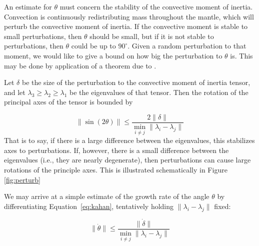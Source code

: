 \documentclass[extra,mreferee]{gji}
\begin{document}
An estimate for $\theta$ must concern the stability of the convective moment of inertia. 
Convection is continuously redistributing mass throughout the mantle, which will perturb the convective moment of inertia.  
If the convective moment is stable to small perturbations, then $\theta$ should be small, but if it is not stable to perturbations, then $\theta$ could be up to $90^\circ$. 
Given a random perturbation to that moment, we would like to give a bound on how big the perturbation to $\theta$ is. 
This may be done by application of a theorem due to \citet{davis1970rotation}.

Let $\delta$ be the size of the perturbation to the convective moment of inertia tensor, and let $\lambda_3 \ge \lambda_2 \ge \lambda_1$ be the eigenvalues of that tensor.  
Then the rotation of the principal axes of the tensor is bounded by

\begin{equation}
\lVert \sin(2 \theta) \rVert \le \frac{ 2 \lVert \delta \rVert}{ \displaystyle \min_{i \neq j} \lVert \lambda_i - \lambda_j \rVert }
\label{eq:kahan}
\end{equation} 
That is to say, if there is a large difference between the eigenvalues, this stabilizes axes to perturbations.  
If, however, there is a small difference between the eigenvalues (i.e., they are nearly degenerate), then perturbations can cause large rotations of the principle axes.
This is illustrated schematically in Figure \ref{fig:perturb}

We may arrive at a simple estimate of the growth rate of the angle $\theta$ by differentiating Equation~\eqref{eq:kahan}, tentatively holding $\lVert \lambda_i - \lambda_j \rVert$ fixed:

\begin{equation}
\lVert \dot{\theta} \rVert \le \frac{ \lVert \dot{\delta} \rVert}{ \displaystyle \min_{i \neq j} \lVert \lambda_i - \lambda_j \rVert }
\label{eq:grow_perturbation}
\end{equation} 
\end{document}
